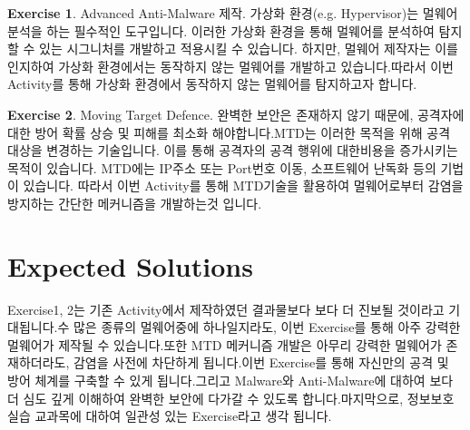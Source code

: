 \documentclass[a4paper, 11pt]{article}
\theoremstyle{definition}
\newtheorem{exercise}{Exercise}
\begin{document}
	\begin{exercise}

	Advanced Anti-Malware 제작.
	가상화 환경(e.g. Hypervisor)는 멀웨어 분석을 하는 필수적인 도구입니다. 이러한 가상화 환경을 통해 멀웨어를 분석하여 탐지할 수 있는 시그니처를 개발하고 적용시킬 수 있습니다.\cite{signature} 하지만, 멀웨어 제작자는 이를 인지하여 가상화 환경에서는 동작하지 않는 멀웨어를 개발하고 있습니다.따라서 이번 Activity를 통해 가상화 환경에서 동작하지 않는 멀웨어를 탐지하고자 합니다.

	\end{exercise}

	\begin{exercise}

	Moving Target Defence.
	완벽한 보안은 존재하지 않기 때문에, 공격자에 대한 방어 확률 상승 및 피해를 최소화 해야합니다.MTD는 이러한 목적을 위해 공격 대상을 변경하는 기술입니다. 이를 통해 공격자의 공격 행위에 대한비용을 증가시키는 목적이 있습니다. MTD에는 IP주소 또는 Port번호 이동, 소프트웨어 난독화 등의 기법이 있습니다.\cite{mtd:2016} 따라서 이번 Activity를 통해 MTD기술을 활용하여 멀웨어로부터 감염을 방지하는 간단한 메커니즘을 개발하는것 입니다.

	\end{exercise}

	\section{Expected Solutions}

	Exercise1, 2는 기존 Activity에서 제작하였던 결과물보다 보다 더 진보될 것이라고 기대됩니다.수 많은 종류의 멀웨어중에 하나일지라도, 이번 Exercise를 통해 아주 강력한 멀웨어가 제작될 수 있습니다.또한 MTD 메커니즘 개발은 아무리 강력한 멀웨어가 존재하더라도, 감염을 사전에 차단하게 됩니다.이번 Exercise를 통해 자신만의 공격 및 방어 체계를 구축할 수 있게 됩니다.그리고 Malware와 Anti-Malware에 대하여 보다 더 심도 깊게 이해하여 완벽한 보안에 다가갈 수 있도록 합니다.마지막으로, 정보보호 실습 교과목에 대하여 일관성 있는 Exercise라고 생각 됩니다.


	
	

	
\end{document}
